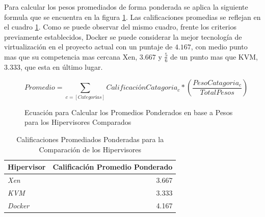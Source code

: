 Para calcular los pesos promediados de forma ponderada se aplica la siguiente formula que se encuentra en la figura \ref{fig:hipervisor-calif-equ}. Las calificaciones promedias se reflejan en el cuadro \ref{tab:hipervisor-compar-promed}. Como se puede observar del mismo cuadro, frente los criterios previamente establecidos, Docker se puede considerar la mejor tecnología de virtualización en el proyecto actual con un puntaje de $4.167$, con medio punto mas que su competencia mas cercana Xen, $3.667$ y $\frac{5}{6}$ de un punto mas que KVM, $3.333$, que esta en último lugar.

\begin{figure}
	\[
		Promedio = \sum_{c = [Categorías]} CalificaciónCatagoria_c * \left ( \frac{PesoCatagoria_c}{TotalPesos} \right )
	\]
	\caption{Ecuación para Calcular los Promedios Ponderados en base a Pesos para los Hipervisores Comparados}
    \label{fig:hipervisor-calif-equ}
\end{figure}

\begin{table}
	\centering
	\begin{tabular}{|l|r|}
    	\hline
		\textbf{Hipervisor} & \textbf{Calificación Promedio Ponderado} \\
        \hline
        \textit{Xen} & 3.667 \\
        \hline
        \textit{KVM} & 3.333 \\
        \hline
        \textit{Docker} & 4.167 \\
        \hline
	\end{tabular}
    \caption{Calificaciones Promediados Ponderadas para la Comparación de los Hipervisores}
    \label{tab:hipervisor-compar-promed}
\end{table}

  
